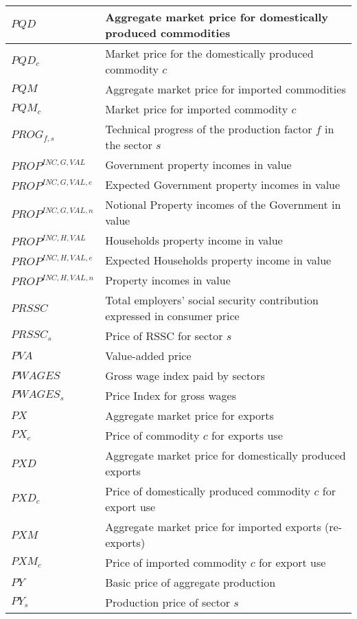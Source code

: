 \documentclass[12pt]{article}
\numberwithin{equation}{section}
\begin{document}
\begin{longtable}{@{}p{4cm}p{9cm}@{}}
 \midrule 
$PQD$ & Aggregate market price for domestically produced commodities \\
 \midrule 
$PQD_{c}$ & Market price for the domestically produced commodity $c$ \\
 \midrule 
$PQM$ & Aggregate market price for imported commodities \\
 \midrule 
$PQM_{c}$ & Market price for imported commodity $c$ \\
 \midrule 
$PROG_{f, s}$ & Technical progress of the production factor $f$ in the sector $s$ \\
 \midrule 
$PROP^{INC,G,VAL}$ & Government property incomes in value \\
 \midrule 
$PROP^{INC,G,VAL,e}$ & Expected Government property incomes in value \\
 \midrule 
$PROP^{INC,G,VAL,n}$ & Notional Property incomes of the Government in value \\
 \midrule 
$PROP^{INC,H,VAL}$ &  Households property income in value \\
 \midrule 
$PROP^{INC,H,VAL,e}$ & Expected Households property income in value \\
 \midrule 
$PROP^{INC,H,VAL,n}$ & Property incomes in value \\
 \midrule 
$PRSSC$ & Total employers' social security contribution expressed in consumer price \\
 \midrule 
$PRSSC_{s}$ & Price of RSSC for sector $s$ \\
 \midrule 
$PVA$ & Value-added price \\
 \midrule 
$PWAGES$ & Gross wage index paid by sectors \\
 \midrule 
$PWAGES_{s}$ & Price Index for gross wages \\
 \midrule 
$PX$ & Aggregate market price for exports \\
 \midrule 
$PX_{c}$ & Price of commodity $c$ for exports use \\
 \midrule 
$PXD$ & Aggregate market price for domestically produced exports \\
 \midrule 
$PXD_{c}$ & Price of domestically produced commodity $c$ for export use \\
 \midrule 
$PXM$ & Aggregate market price for imported exports (re-exports) \\
 \midrule 
$PXM_{c}$ & Price of imported commodity $c$ for export use \\
 \midrule 
$PY$ & Basic price of aggregate production \\
 \midrule 
$PY_{s}$ & Production price of sector $s$ \\

\end{longtable}
\end{document}
